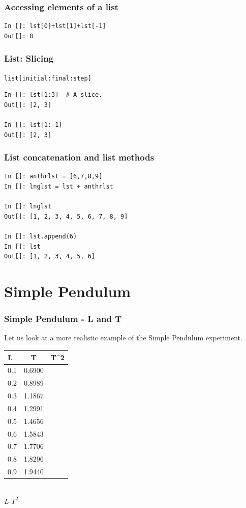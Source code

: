 \documentclass[14pt,compress]{beamer}
\newcounter{time}
\newcommand{\inctime}[1]{\addtocounter{time}{#1}{\tiny \thetime\ m}}
\newcommand{\typ}[1]{\lstinline{#1}}
\begin{document}
\begin{frame}[fragile]
\frametitle{Accessing elements of a list}
\begin{lstlisting}
In []: lst[0]+lst[1]+lst[-1]
Out[]: 8
\end{lstlisting}
\end{frame}

\begin{frame}[fragile]
  \frametitle{List: Slicing}
\alert{\typ{list[initial:final:step]}}
\begin{lstlisting}
In []: lst[1:3]  # A slice.
Out[]: [2, 3]

In []: lst[1:-1]
Out[]: [2, 3]
\end{lstlisting}
\end{frame}

\begin{frame}[fragile]
  \frametitle{List concatenation and list methods}
\begin{lstlisting}
In []: anthrlst = [6,7,8,9]
In []: lnglst = lst + anthrlst

In []: lnglst
Out[]: [1, 2, 3, 4, 5, 6, 7, 8, 9]

In []: lst.append(6)
In []: lst
Out[]: [1, 2, 3, 4, 5, 6]
\end{lstlisting}
\end{frame}

\section{Simple Pendulum}
\begin{frame}[fragile]
\frametitle{Simple Pendulum - L and T}
Let us look at a more realistic example of the Simple Pendulum experiment.
\begin{center}
\begin{small}
\begin{tabular}{| l | c | r |}
\hline
L & T & T^2 \\ \hline
0.1 & 0.6900 & \\ \hline
0.2 & 0.8989 & \\ \hline
0.3 & 1.1867 & \\ \hline
0.4 & 1.2991 & \\ \hline
0.5 & 1.4656 & \\ \hline
0.6 & 1.5843 & \\ \hline
0.7 & 1.7706 & \\ \hline
0.8 & 1.8296 & \\ \hline
0.9 & 1.9440 & \\ \hline
\end{tabular}
\end{small}\\
\alert{$L$ \alpha $T^2$}
\end{center}
\end{frame}
\end{document}

